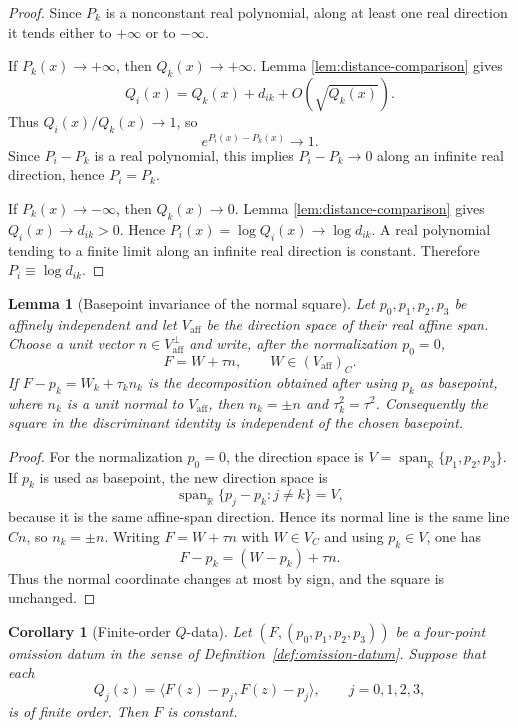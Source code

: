 \documentclass[11pt]{amsart}
\def\CC{C}%
\numberwithin{equation}{section}
\newtheorem{lemma}[theorem]{Lemma}
\newtheorem{corollary}[theorem]{Corollary}
\theoremstyle{definition}
\theoremstyle{remark}
\newcommand{\CC}{\mathbb C}
\newcommand{\RR}{\mathbb R}
\begin{document}
\begin{proof}
Since $P_k$ is a nonconstant real polynomial, along at least one real direction it tends either to $+\infty$ or to $-\infty$.

If $P_k(x)\to+\infty$, then $Q_k(x)\to+\infty$. Lemma \ref{lem:distance-comparison} gives
\[
Q_i(x)=Q_k(x)+d_{ik}+O(\sqrt{Q_k(x)}).
\]
Thus $Q_i(x)/Q_k(x)\to1$, so
\[
e^{P_i(x)-P_k(x)}\to1.
\]
Since $P_i-P_k$ is a real polynomial, this implies $P_i-P_k\to0$ along an infinite real direction, hence $P_i=P_k$.

If $P_k(x)\to-\infty$, then $Q_k(x)\to0$. Lemma \ref{lem:distance-comparison} gives $Q_i(x)\to d_{ik}>0$. Hence $P_i(x)=\log Q_i(x)\to\log d_{ik}$. A real polynomial tending to a finite limit along an infinite real direction is constant. Therefore $P_i\equiv\log d_{ik}$.
\end{proof}

\begin{lemma}[Basepoint invariance of the normal square]\label{lem:basepoint-invariance}
Let $p_0,p_1,p_2,p_3$ be affinely independent and let $V_{\mathrm{aff}}$ be the direction space of their real affine span.  Choose a unit vector $n\in V_{\mathrm{aff}}^\perp$ and write, after the normalization $p_0=0$,
\[
F=W+\tau n,\qquad W\in (V_{\mathrm{aff}})_{\CC}.
\]
If $F-p_k=W_k+\tau_k n_k$ is the decomposition obtained after using $p_k$ as basepoint, where $n_k$ is a unit normal to $V_{\mathrm{aff}}$, then $n_k=\pm n$ and $\tau_k^2=\tau^2$.  Consequently the square in the discriminant identity is independent of the chosen basepoint.
\end{lemma}

\begin{proof}
For the normalization $p_0=0$, the direction space is $V=\operatorname{span}_{\RR}\{p_1,p_2,p_3\}$.  If $p_k$ is used as basepoint, the new direction space is
\[
\operatorname{span}_{\RR}\{p_j-p_k:j\ne k\}=V,
\]
because it is the same affine-span direction.  Hence its normal line is the same line $\CC n$, so $n_k=\pm n$.  Writing $F=W+\tau n$ with $W\in V_{\CC}$ and using $p_k\in V$, one has
\[
F-p_k=(W-p_k)+\tau n.
\]
Thus the normal coordinate changes at most by sign, and the square is unchanged.
\end{proof}

\begin{corollary}[Finite-order $Q$-data]\label{cor:finite-order-Q-data}
Let $(F,(p_0,p_1,p_2,p_3))$ be a four-point omission datum in the sense of Definition~\ref{def:omission-datum}. Suppose that each
\[
Q_j(z)=\langle F(z)-p_j,F(z)-p_j\rangle,\qquad j=0,1,2,3,
\]
is of finite order. Then $F$ is constant.
\end{corollary}
\end{document}
